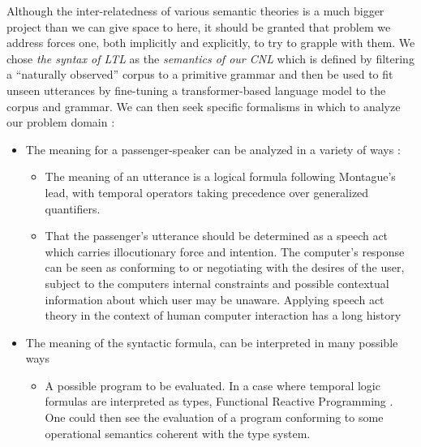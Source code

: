 \documentclass[a4paper, 11pt]{article}
\begin{document}
Although the inter-relatedness of various semantic theories is a much bigger
project than we can give space to here, it should be granted that problem we
address forces one, both implicitly and explicitly, to try to grapple with them.
We chose \emph{the syntax of LTL} as the \emph{semantics of our CNL} which is
defined by filtering a ``naturally observed'' corpus to a primitive grammar and
then be used to fit unseen utterances by fine-tuning a transformer-based
language model to the corpus and grammar. We can then seek specific formalisms
in which to analyze our problem domain :

\begin{itemize}
\item The meaning for a passenger-speaker can be analyzed in a variety of ways :
  \begin{itemize}
    \item The meaning of an utterance is a logical formula following Montague's
    lead, with temporal operators taking precedence over generalized quantifiers.
    \item That the passenger's utterance should be determined as a speech act
      which carries illocutionary force and intention. The computer's
      response can be seen as conforming to or negotiating with the desires of
      the user, subject to the computers internal constraints and possible
      contextual information about which user may be unaware. Applying speech
      act theory in the context of human computer interaction has a long history
      \cite{winograd}
  \end{itemize}
\item The meaning of the syntactic formula, can be interpreted in many possible ways
  \begin{itemize}
    \item A possible program to be evaluated. In a case where
      temporal logic formulas are interpreted as types, Functional Reactive
      Programming \cite{hudak}. One could then see the
      evaluation of a program conforming to some operational semantics coherent
      with the type system.

\end{itemize}
\end{itemize}
\end{document}
